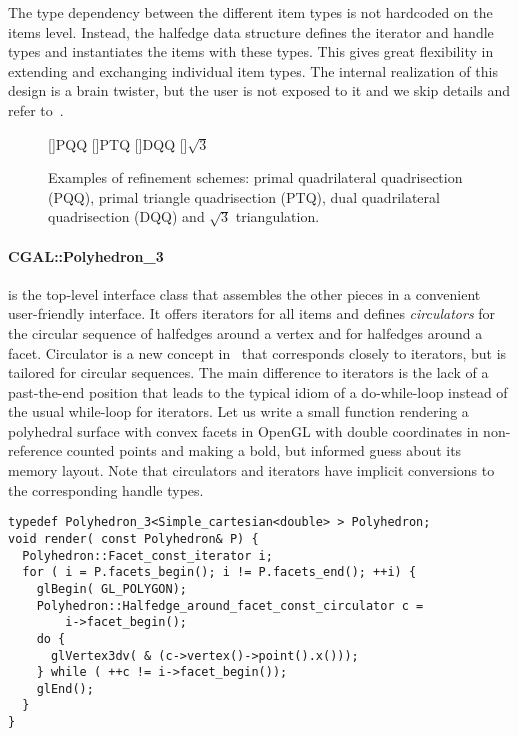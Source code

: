 The type dependency between the different item types is not hardcoded
on the items level. Instead, the halfedge data structure defines the
iterator and handle types and instantiates the items with these types.
This gives great flexibility in extending and exchanging individual
item types. The internal realization of this design is a brain
twister, but the user is not exposed to it and we skip details and refer
to~\cite{k-ugpdd-99}.

\begin{figure}[tb]
  \centering
  []{\scriptsize PQQ} 
  []{\scriptsize PTQ}
  []{\scriptsize DQQ} 
  []{\scriptsize $\sqrt{3}$} 
  \caption{Examples of refinement schemes: 
    primal quadrilateral quadrisection (PQQ),
    primal triangle quadrisection (PTQ),
    dual quadrilateral quadrisection (DQQ) and
    $\sqrt{3}$ triangulation.}
  \label{fig:RefSchemes}
\end{figure}



\paragraph*{CGAL::Polyhedron\_3} is the top-level interface class that
assembles the other pieces in a convenient user-friendly interface.
It offers iterators for all items and defines \emph{circulators} for
the circular sequence of halfedges around a vertex and for halfedges
around a facet. Circulator is a new concept in \cgal\ that
corresponds closely to iterators, but is tailored for circular
sequences.  The main difference to iterators is the lack of a
past-the-end position that leads to the typical idiom of a
do-while-loop instead of the usual while-loop for iterators.  Let us
write a small function rendering a polyhedral surface with convex
facets in OpenGL with double coordinates in non-reference counted
points and making a bold, but informed guess about its memory layout.
Note that circulators and iterators have implicit conversions to the
corresponding handle types.

\begin{lstlisting}
typedef Polyhedron_3<Simple_cartesian<double> > Polyhedron;
void render( const Polyhedron& P) {
  Polyhedron::Facet_const_iterator i;
  for ( i = P.facets_begin(); i != P.facets_end(); ++i) {
    glBegin( GL_POLYGON);
    Polyhedron::Halfedge_around_facet_const_circulator c = 
        i->facet_begin();
    do {
      glVertex3dv( & (c->vertex()->point().x()));
    } while ( ++c != i->facet_begin());
    glEnd();
  }
}
\end{lstlisting}%
\vspace*{-4mm}

